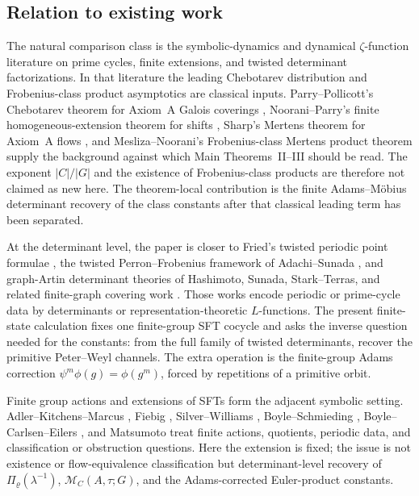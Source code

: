 \subsection{Relation to existing work}

The natural comparison class is the symbolic-dynamics and dynamical
\(\zeta\)-function literature on prime cycles, finite extensions, and
twisted determinant factorizations.  In that literature the leading
Chebotarev distribution and Frobenius-class product asymptotics are
classical inputs.  Parry--Pollicott's Chebotarev theorem for Axiom~A
Galois coverings \cite{ParryPollicott1986Chebotarev}, Noorani--Parry's
finite homogeneous-extension theorem for shifts
\cite{NooraniParry1992ChebotarevShifts}, Sharp's Mertens theorem for
Axiom~A flows \cite{Sharp1991Mertens}, and Mesliza--Noorani's
Frobenius-class Mertens product theorem
\cite{MeslizaNoorani1999FrobeniusMertens} supply the background against
which Main Theorems~II--III should be read.  The exponent
\(|C|/|G|\) and the existence of Frobenius-class products are therefore
not claimed as new here.  The theorem-local contribution is the finite
Adams--M\"obius determinant recovery of the class constants after that
classical leading term has been separated.

At the determinant level, the paper is closer to Fried's twisted periodic
point formulae \cite{Fried1983PeriodicPointsTwistedCoefficients,Fried1983HomologicalIdentitiesClosedOrbits}, the twisted
Perron--Frobenius framework of Adachi--Sunada
\cite{AdachiSunada1987TwistedPF}, and graph-Artin determinant theories of
Hashimoto, Sunada, Stark--Terras, and related finite-graph covering work
\cite{Hashimoto1989ZetaFiniteGraphs,Hashimoto1990ZetaLFunctionsFiniteGraphs,Hashimoto1992ArtinDensityPrimeCycles,Sunada1986LFunctionsGeometry,StarkTerras1996FiniteGraphsCoverings,StarkTerras2000FiniteGraphsCoveringsII,StarkTerras2007FiniteGraphsCoveringsIII}.  Those works encode periodic
or prime-cycle data by determinants or representation-theoretic
\(L\)-functions.  The present finite-state calculation fixes one
finite-group SFT cocycle and asks the inverse question needed for the
constants: from the full family of twisted determinants, recover the
primitive Peter--Weyl channels.  The extra operation is the finite-group
Adams correction \(\psi^m\phi(g)=\phi(g^m)\), forced by repetitions of a
primitive orbit.

Finite group actions and extensions of SFTs form the adjacent symbolic
setting.  Adler--Kitchens--Marcus \cite{AdlerKitchensMarcus1985FiniteGroupActions},
Fiebig \cite{Fiebig1993PeriodicFiniteGroupActions}, Silver--Williams
\cite{SilverWilliams2005InvariantFiniteGroupActions}, Boyle--Schmieding
\cite{BoyleSchmieding2017FiniteGroupExtensions}, Boyle--Carlsen--Eilers
\cite{BoyleCarlsenEilers2020FlowEquivalenceGSFT}, and Matsumoto
\cite{Matsumoto2016ExtensionsSubshiftsFiniteGroups} treat finite actions,
quotients, periodic data, and classification or obstruction questions.
Here the extension is fixed; the issue is not existence or
flow-equivalence classification but determinant-level recovery of
\(\Pi_\varrho(\lambda^{-1})\), \(\mathcal M_C(A,\tau;G)\), and the
Adams-corrected Euler-product constants.


